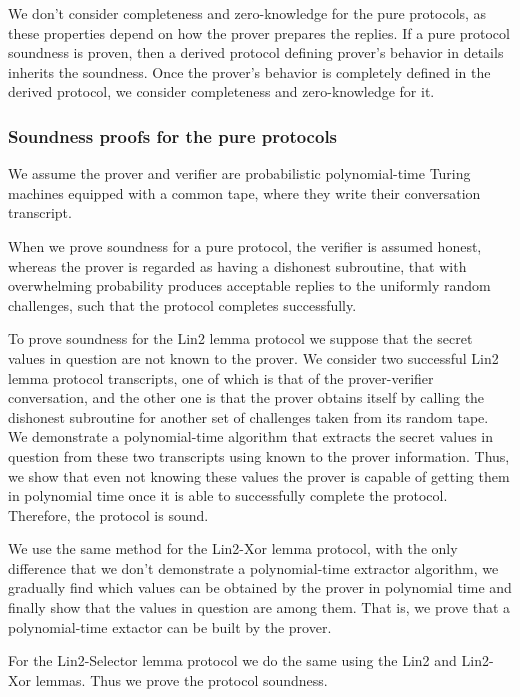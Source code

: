 \documentclass{mathcryptology} %
\theoremstyle{title}
\theoremstyle{titleof}
\begin{document}
    We don't consider completeness and zero-knowledge for the pure protocols, as these properties depend on how the prover prepares the replies.
    If a pure protocol soundness is proven, then a derived protocol defining prover's behavior in details inherits the soundness. Once the prover's behavior is completely defined in the derived protocol, we consider completeness and zero-knowledge for it.
    

\subsubsection{Soundness proofs for the pure protocols}
    We assume the prover and verifier are probabilistic polynomial-time Turing machines equipped with a common tape, where they write their conversation transcript. 
    
    When we prove soundness for a pure protocol, the verifier is assumed honest, whereas the prover is regarded as having a dishonest subroutine, that with overwhelming probability produces acceptable replies to the uniformly random challenges, such that the protocol completes successfully.

    To prove soundness for the Lin2 lemma protocol we suppose that the secret values in question are not known to the prover. We consider two successful Lin2 lemma protocol transcripts, one of which is that of the prover-verifier conversation, and the other one is that the prover obtains itself by calling the dishonest subroutine for another set of challenges taken from its random tape. We demonstrate a polynomial-time algorithm that extracts the secret values in question from these two transcripts using known to the prover information. Thus, we show that even not knowing these values the prover is capable of getting them in polynomial time once it is able to successfully complete the protocol. Therefore, the protocol is sound.
    
    We use the same method for the Lin2-Xor lemma protocol, with the only difference that we don't demonstrate a polynomial-time extractor algorithm, we gradually find which values can be obtained by the prover in polynomial time and finally show that the values in question are among them. That is, we prove that a polynomial-time extactor can be built by the prover.
    
    For the Lin2-Selector lemma protocol we do the same using the Lin2 and Lin2-Xor lemmas. Thus we prove the protocol soundness.
\end{document}
